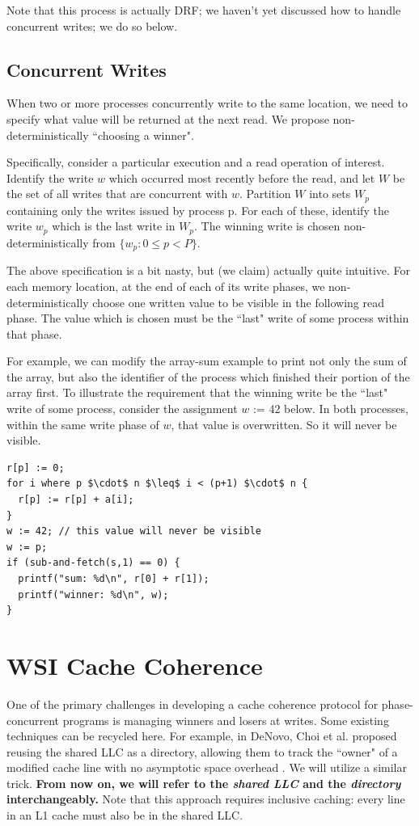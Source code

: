 \documentclass{article}
\begin{document}
Note that this process is actually DRF; we haven't yet discussed how to handle concurrent writes; we do so below.

\subsection{Concurrent Writes}
When two or more processes concurrently write to the same location, we need to specify what value will be returned at the next read. We propose non-deterministically ``choosing a winner".

Specifically, consider a particular execution and a read operation of interest. Identify the write $w$ which occurred most recently before the read, and let $W$ be the set of all writes that are concurrent with $w$. Partition $W$ into sets $W_p$ containing only the writes issued by process p. For each of these, identify the write $w_p$ which is the last write in $W_p$. The winning write is chosen non-deterministically from $\{w_p : 0 \leq p < P\}$.

The above specification is a bit nasty, but (we claim) actually quite intuitive. For each memory location, at the end of each of its write phases, we non-deterministically choose one written value to be visible in the following read phase. The value which is chosen must be the ``last" write of some process within that phase.

For example, we can modify the array-sum example to print not only the sum of the array, but also the identifier of the process which finished their portion of the array first. To illustrate the requirement that the winning write be the ``last" write of some process, consider the assignment $w$ := 42 below. In both processes, within the same write phase of $w$, that value is overwritten. So it will never be visible.

\begin{lstlisting}
r[p] := 0;
for i where p $\cdot$ n $\leq$ i < (p+1) $\cdot$ n {
  r[p] := r[p] + a[i];
}
w := 42; // this value will never be visible
w := p;
if (sub-and-fetch(s,1) == 0) {
  printf("sum: %d\n", r[0] + r[1]);
  printf("winner: %d\n", w);
}
\end{lstlisting}


\section{WSI Cache Coherence}
One of the primary challenges in developing a cache coherence protocol for phase-concurrent programs is managing winners and losers at writes. Some existing techniques can be recycled here. For example, in DeNovo, Choi et al. proposed reusing the shared LLC as a directory, allowing them to track the ``owner" of a modified cache line with no asymptotic space overhead \cite{choi2010denovo}. We will utilize a similar trick. \textbf{From now on, we will refer to the \textit{shared LLC} and the \textit{directory} interchangeably.} Note that this approach requires inclusive caching: every line in an L1 cache must also be in the shared LLC.
\end{document}
